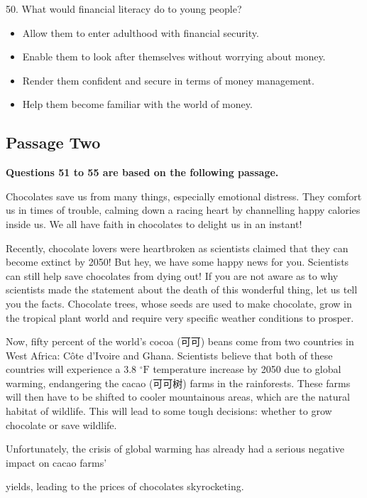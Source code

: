\documentclass[UTF8,11pt]{ctexart}
\begin{document}
50. What would financial literacy do to young people?


\begin{itemize}[leftmargin=2em,itemsep=.2em,topsep=.4em]\item[A.] Allow them to enter adulthood with financial security.
\item[B.] Enable them to look after themselves without worrying about money.
\item[C.] Render them confident and secure in terms of money management.
\item[D.] Help them become familiar with the world of money.
\end{itemize}

\subsection*{\textbf{Passage Two}}


\textbf{Questions 51 to 55 are based on the following passage.}


Chocolates save us from many things, especially emotional distress. They comfort us in times of trouble, calming down a racing heart by channelling happy calories inside us. We all have faith in chocolates to delight us in an instant!


Recently, chocolate lovers were heartbroken as scientists claimed that they can become extinct by 2050! But hey, we have some happy news for you. Scientists can still help save chocolates from dying out! If you are not aware as to why scientists made the statement about the death of this wonderful thing, let us tell you the facts. Chocolate trees, whose seeds are used to make chocolate, grow in the tropical plant world and require very specific weather conditions to prosper.


Now, fifty percent of the world’s cocoa (可可) beans come from two countries in West Africa: Côte d’Ivoire and Ghana. Scientists believe that both of these countries will experience a 3.8 \(^{\circ}\mathrm{F}\) temperature increase by 2050 due to global warming, endangering the cacao (可可树) farms in the rainforests. These farms will then have to be shifted to cooler mountainous areas, which are the natural habitat of wildlife. This will lead to some tough decisions: whether to grow chocolate or save wildlife.


Unfortunately, the crisis of global warming has already had a serious negative impact on cacao farms’


yields, leading to the prices of chocolates skyrocketing.
\end{document}
